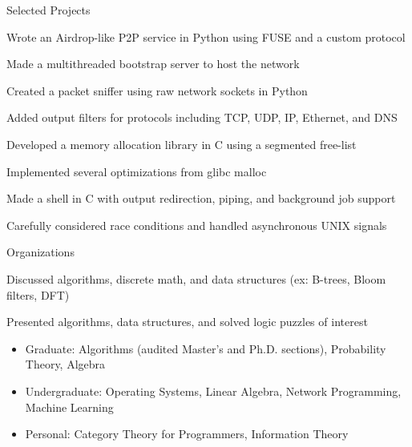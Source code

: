 \documentclass{cv}
\begin{document}
\begin{cvsection}{Selected Projects}
  {
    \item Wrote an Airdrop-like P2P service in Python using FUSE and a custom protocol
    \item Made a multithreaded bootstrap server to host the network
  }
  {
    \item Created a packet sniffer using raw network sockets in Python
    \item Added output filters for protocols including TCP, UDP, IP, Ethernet, and DNS
  }
  {
    \item Developed a memory allocation library in C using a segmented free-list
    \item Implemented several optimizations from glibc malloc
  }
  {
    \item Made a shell in C with output redirection, piping, and background job support
    \item Carefully considered race conditions and handled asynchronous UNIX signals
  }
\end{cvsection}

\begin{cvsection}{Organizations}
  {
    \item Discussed algorithms, discrete math, and data structures (ex: B-trees, Bloom filters, DFT)
  }
  {
    \item Presented algorithms, data structures, and solved logic puzzles of interest
  }
\end{cvsection}

\begin{minipage}{\textwidth}
  \begin{itemize}[noitemsep,topsep=0pt]%
    \item Graduate: Algorithms (audited Master's and Ph.D. sections), Probability Theory, Algebra
    \item Undergraduate: Operating Systems, Linear Algebra, Network Programming, Machine Learning
    \item Personal: Category Theory for Programmers, Information Theory
  \end{itemize}%
\end{minipage}%
\end{document}
